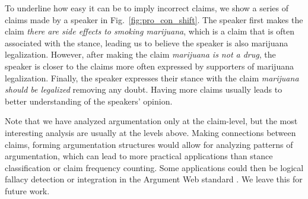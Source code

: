 To underline how easy it can be to imply incorrect claims, we show a series of
claims made by a speaker in Fig.~\ref{fig:pro_con_shift}.  The speaker first
makes the claim \emph{there are side effects to smoking marijuana}, which is a
claim that is often associated with the  stance, leading us to believe
the speaker is also  marijuana legalization.  However, after
making the claim \emph{marijuana is not a drug}, the speaker is closer to the
claims more often expressed by supporters of marijuana legalization.  Finally,
the speaker expresses their  stance with the claim \emph{marijuana
should be legalized} removing any doubt. Having more claims usually leads to
better understanding of the speakers' opinion. 

Note that we have analyzed argumentation only at the 
claim-level, but the most interesting analysis are usually at the levels above. 
Making connections between claims, forming argumentation structures would allow
for analyzing patterns of argumentation, which can lead to 
more practical applications
than stance classification or claim frequency counting. 
Some applications could then 
be logical fallacy detection or integration in the Argument Web standard
\citep{rahwan2007laying}. We leave this for future work.


% 
% 


